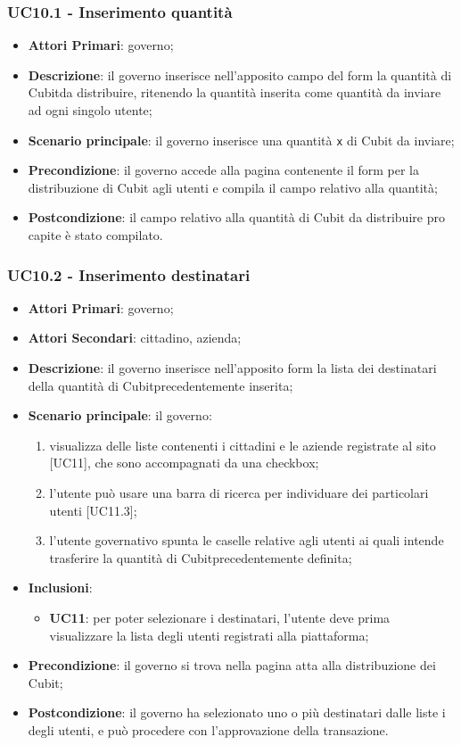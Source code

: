 \subsubsection{UC10.1 - Inserimento quantità}
\begin{itemize}
	\item \textbf{Attori Primari}: governo;
	\item \textbf{Descrizione}: il governo inserisce nell'apposito campo del form la quantità di Cubit\glosp da distribuire, ritenendo la quantità inserita come quantità da inviare ad ogni singolo utente;
	\item \textbf{Scenario principale}: il governo inserisce una quantità \texttt{x} di Cubit da inviare;
	\item \textbf{Precondizione}: il governo accede alla pagina contenente il form per la distribuzione di Cubit agli utenti e compila il campo relativo alla quantità;
	\item \textbf{Postcondizione}: il campo relativo alla quantità di Cubit da distribuire pro capite è stato compilato. 
\end{itemize}
\subsubsection{UC10.2 - Inserimento destinatari}
\begin{itemize}
	\item \textbf{Attori Primari}: governo;
	\item \textbf{Attori Secondari}: cittadino, azienda;
	\item \textbf{Descrizione}: il governo inserisce nell'apposito form la lista dei destinatari della quantità di Cubit\glosp precedentemente inserita;
	\item \textbf{Scenario principale}: il governo:
	\begin{enumerate}[label=\alph*.]
		\item visualizza delle liste contenenti i cittadini e le aziende registrate al sito [UC11], che sono accompagnati da una checkbox;
		\item l'utente può usare una barra di ricerca per individuare dei particolari utenti [UC11.3];
		\item l'utente governativo spunta le caselle relative agli utenti ai quali intende trasferire la quantità di Cubit\glosp precedentemente definita;
	\end{enumerate}
	\item \textbf{Inclusioni}:
	\begin{itemize}
		\item \textbf{UC11}: per poter selezionare i destinatari, l'utente deve prima visualizzare la lista degli utenti registrati alla piattaforma;
	\end{itemize}
	\item \textbf{Precondizione}: il governo si trova nella pagina atta alla distribuzione dei Cubit;
	\item \textbf{Postcondizione}: il governo ha selezionato uno o più destinatari dalle liste i degli utenti, e può procedere con l'approvazione della transazione.
\end{itemize}
